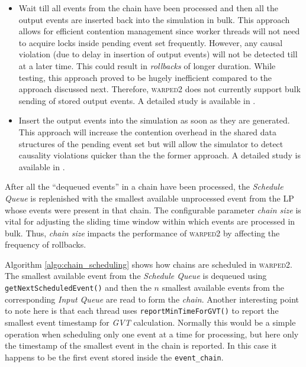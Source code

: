 \documentclass[11pt]{book}
\begin{document}
\begin{itemize}

\item Wait till all events from the chain have been processed and then all the output events are inserted back
  into the simulation in bulk.  This approach allows for efficient contention management since worker threads
  will not need to acquire locks inside pending event set frequently.  However, any causal violation (due to
  delay in insertion of output events) will not be detected till at a later time.  This could result in
  \emph{rollbacks} of longer duration.  While testing, this approach proved to be hugely inefficient compared
  to the approach discussed next.  Therefore, \textsc{warped2} does not currently support bulk sending of
  stored output events.  A detailed study is available in \cite{gupta-17}.

\item Insert the output events into the simulation as soon as they are generated.  This approach will increase
  the contention overhead in the shared data structures of the pending event set but will allow the simulator
  to detect causality violations quicker than the the former approach.  A detailed study is available in
  \cite{gupta-17}.

\end{itemize}

After all the ``dequeued events'' in a chain have been processed, the \emph{Schedule Queue} is replenished
with the smallest available unprocessed event from the LP whose events were present in that chain.  The
configurable parameter \emph{chain size} is vital for adjusting the sliding time window within which events
are processed in bulk.  Thus, \emph{chain size} impacts the performance of \textsc{warped2} by affecting the
frequency of rollbacks.

Algorithm \ref{algo:chain_scheduling} shows how chains are scheduled in \textsc{warped2}.  The smallest
available event from the \emph{Schedule Queue} is dequeued using \texttt{getNextScheduledEvent()} and then the
$n$ smallest available events from the corresponding \emph{Input Queue} are read to form the
\emph{chain}.  Another interesting point to note here is that each thread uses \texttt{reportMinTimeForGVT()}
to report the smallest event timestamp for \emph{GVT} calculation.  Normally this would be a simple operation
when scheduling only one event at a time for processing, but here only the timestamp of the smallest event in
the chain is reported.  In this case it happens to be the first event stored inside the \texttt{event\_chain}.
\end{document}
